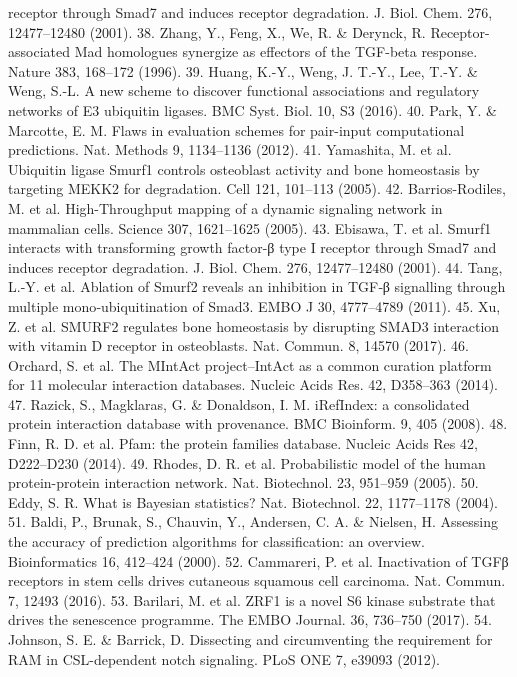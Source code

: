 receptor through Smad7 and induces receptor degradation. J. Biol. Chem. 276,
12477–12480 (2001).
38. Zhang, Y., Feng, X., We, R. \& Derynck, R. Receptor-associated Mad
homologues synergize as effectors of the TGF-beta response. Nature 383,
168–172 (1996).
39. Huang, K.-Y., Weng, J. T.-Y., Lee, T.-Y. \& Weng, S.-L. A new scheme to
discover functional associations and regulatory networks of E3 ubiquitin
ligases. BMC Syst. Biol. 10, S3 (2016).
40. Park, Y. \& Marcotte, E. M. Flaws in evaluation schemes for pair-input
computational predictions. Nat. Methods 9, 1134–1136 (2012).
41. Yamashita, M. et al. Ubiquitin ligase Smurf1 controls osteoblast activity and bone
homeostasis by targeting MEKK2 for degradation. Cell 121, 101–113 (2005).
42. Barrios-Rodiles, M. et al. High-Throughput mapping of a dynamic signaling
network in mammalian cells. Science 307, 1621–1625 (2005).
43. Ebisawa, T. et al. Smurf1 interacts with transforming growth factor-β type I
receptor through Smad7 and induces receptor degradation. J. Biol. Chem. 276,
12477–12480 (2001).
44. Tang, L.-Y. et al. Ablation of Smurf2 reveals an inhibition in TGF‐β signalling
through multiple mono‐ubiquitination of Smad3. EMBO J 30, 4777–4789 (2011).
45. Xu, Z. et al. SMURF2 regulates bone homeostasis by disrupting SMAD3
interaction with vitamin D receptor in osteoblasts. Nat. Commun. 8, 14570 (2017).
46. Orchard, S. et al. The MIntAct project--IntAct as a common curation platform
for 11 molecular interaction databases. Nucleic Acids Res. 42, D358–363 (2014).
47. Razick, S., Magklaras, G. \& Donaldson, I. M. iRefIndex: a consolidated protein
interaction database with provenance. BMC Bioinform. 9, 405 (2008).
48. Finn, R. D. et al. Pfam: the protein families database. Nucleic Acids Res 42,
D222–D230 (2014).
49. Rhodes, D. R. et al. Probabilistic model of the human protein-protein
interaction network. Nat. Biotechnol. 23, 951–959 (2005).
50. Eddy, S. R. What is Bayesian statistics? Nat. Biotechnol. 22, 1177–1178 (2004).
51. Baldi, P., Brunak, S., Chauvin, Y., Andersen, C. A. \& Nielsen, H. Assessing the
accuracy of prediction algorithms for classiﬁcation: an overview. Bioinformatics
16, 412–424 (2000).
52. Cammareri, P. et al. Inactivation of TGFβ receptors in stem cells drives
cutaneous squamous cell carcinoma. Nat. Commun. 7, 12493 (2016).
53. Barilari, M. et al. ZRF1 is a novel S6 kinase substrate that drives the senescence
programme. The EMBO Journal. 36, 736–750 (2017).
54. Johnson, S. E. \& Barrick, D. Dissecting and circumventing the requirement for
RAM in CSL-dependent notch signaling. PLoS ONE 7, e39093 (2012).
